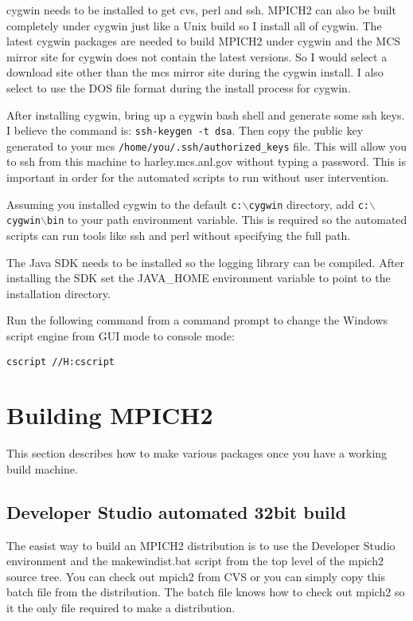 \documentclass[dvipdfm,11pt]{article}
\begin{document}
cygwin needs to be installed to get cvs, perl and ssh.  MPICH2 can also be built completely
under cygwin just like a Unix build so I install all of cygwin.  The latest cygwin packages
are needed to build MPICH2 under cygwin and the MCS mirror site for cygwin does not contain
the latest versions.  So I would select a download site other than the mcs mirror site during
the cygwin install.  I also select to use the DOS file format during the install process for 
cygwin.

After installing cygwin, bring up a cygwin bash shell and generate some ssh keys.  I believe
the command is: \texttt{ssh-keygen -t dsa}.  Then copy the public key generated to your
mcs \texttt{/home/you/.ssh/authorized\_keys} file.  This will allow you to ssh from this machine
to harley.mcs.anl.gov without typing a password.  This is important in order for the 
automated scripts to run without user intervention.

Assuming you installed cygwin to the default \texttt{c:$\backslash$cygwin} directory, add 
\texttt{c:$\backslash$cygwin$\backslash$bin} to your path environment variable.  This is 
required so the automated scripts can run tools like ssh and perl without specifying the 
full path.

The Java SDK needs to be installed so the logging library can be compiled. After installing
the SDK set the JAVA\_HOME environment variable to point to the installation directory. 

Run the following command from a command prompt to change the Windows script engine from
GUI mode to console mode:
\begin{verbatim}
cscript //H:cscript
\end{verbatim}

\section{Building MPICH2}
\label{sec:building}

This section describes how to make various packages once you have a working build machine.

\subsection{Developer Studio automated 32bit build}
\label{sec:devstudiobuild}

The easist way to build an MPICH2 distribution is to use the Developer Studio environment
and the makewindist.bat script from the top level of the mpich2 source tree.  You can check
out mpich2 from CVS or you can simply copy this batch file from the distribution.  The batch
file knows how to check out mpich2 so it the only file required to make a distribution.
\end{document}
